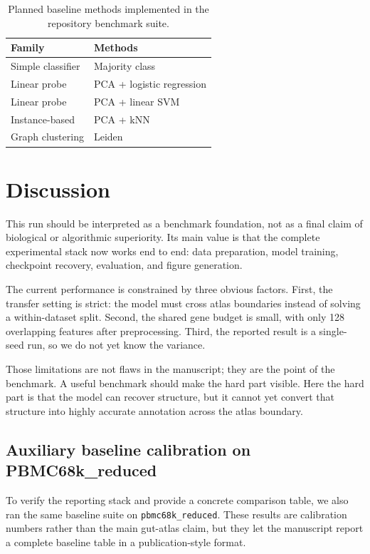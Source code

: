 \documentclass[11pt]{article}
\begin{document}
\begin{table}[H]
\centering
\caption{Planned baseline methods implemented in the repository benchmark suite.}
\begin{tabular}{ll}
\toprule
Family & Methods \\
\midrule
Simple classifier & Majority class \\
Linear probe & PCA + logistic regression \\
Linear probe & PCA + linear SVM \\
Instance-based & PCA + kNN \\
Graph clustering & Leiden \\
\bottomrule
\end{tabular}
\end{table}

\section{Discussion}
This run should be interpreted as a benchmark foundation, not as a final claim of biological or algorithmic superiority.
Its main value is that the complete experimental stack now works end to end: data preparation, model training, checkpoint recovery, evaluation, and figure generation.

The current performance is constrained by three obvious factors.
First, the transfer setting is strict: the model must cross atlas boundaries instead of solving a within-dataset split.
Second, the shared gene budget is small, with only 128 overlapping features after preprocessing.
Third, the reported result is a single-seed run, so we do not yet know the variance.

Those limitations are not flaws in the manuscript; they are the point of the benchmark.
A useful benchmark should make the hard part visible.
Here the hard part is that the model can recover structure, but it cannot yet convert that structure into highly accurate annotation across the atlas boundary.

\subsection{Auxiliary baseline calibration on PBMC68k\_reduced}
To verify the reporting stack and provide a concrete comparison table, we also ran the same baseline suite on \texttt{pbmc68k\_reduced}.
These results are calibration numbers rather than the main gut-atlas claim, but they let the manuscript report a complete baseline table in a publication-style format.
\end{document}
